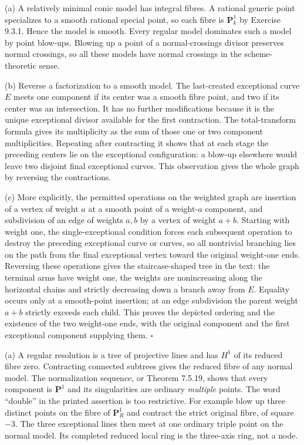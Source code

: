 \documentclass[11pt]{article}
\let\chapterexercise\exercise
\renewcommand{\exercise}[2]{\Needspace{8\baselineskip}\chapterexercise{#1}{#2}}
\begin{document}
\pf (a) A relatively minimal conic model has integral fibres. A rational generic point specializes to a smooth rational special point, so each fibre is $\mathbf P^1_k$ by Exercise 9.3.1. Hence the model is smooth. Every regular model dominates such a model by point blow-ups. Blowing up a point of a normal-crossings divisor preserves normal crossings, so all these models have normal crossings in the scheme-theoretic sense.

(b) Reverse a factorization to a smooth model. The last-created exceptional curve $E$ meets one component if its center was a smooth fibre point, and two if its center was an intersection. It has no further modifications because it is the unique exceptional divisor available for the first contraction. The total-transform formula gives its multiplicity as the sum of those one or two component multiplicities. Repeating after contracting it shows that at each stage the preceding centers lie on the exceptional configuration: a blow-up elsewhere would leave two disjoint final exceptional curves. This observation gives the whole graph by reversing the contractions.

(c) More explicitly, the permitted operations on the weighted graph are insertion of a vertex of weight $a$ at a smooth point of a weight-$a$ component, and subdivision of an edge of weights $a,b$ by a vertex of weight $a+b$. Starting with weight one, the single-exceptional condition forces each subsequent operation to destroy the preceding exceptional curve or curves, so all nontrivial branching lies on the path from the final exceptional vertex toward the original weight-one ends. Reversing these operations gives the staircase-shaped tree in the text: the terminal arms have weight one, the weights are nonincreasing along the horizontal chains and strictly decreasing down a branch away from $E$. Equality occurs only at a smooth-point insertion; at an edge subdivision the parent weight $a+b$ strictly exceeds each child. This proves the depicted ordering and the existence of the two weight-one ends, with the original component and the first exceptional component supplying them. \hfill$\square$

\pf (a) A regular resolution is a tree of projective lines and has $H^1$ of its reduced fibre zero. Contracting connected subtrees gives the reduced fibre of any normal model. The normalization sequence, or Theorem 7.5.19, shows that every component is $\mathbf P^1$ and its singularities are ordinary \emph{multiple} points. The word ``double'' in the printed assertion is too restrictive. For example blow up three distinct points on the fibre of $\mathbf P^1_R$ and contract the strict original fibre, of square $-3$. The three exceptional lines then meet at one ordinary triple point on the normal model. Its completed reduced local ring is the three-axis ring, not a node.
\end{document}
